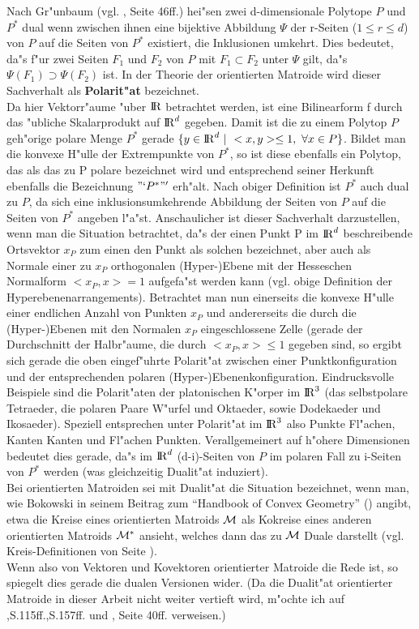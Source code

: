 Nach Gr"unbaum (vgl. \cite{Gr:67}, Seite 46ff.) hei"sen zwei d-dimensionale
Polytope $P$ und $P^*$ dual wenn zwischen ihnen eine bijektive
Abbildung $\Psi$ der r-Seiten ($1\leq r\leq d$) von $P$ auf die Seiten von
$P^*$ existiert, die Inklusionen umkehrt. Dies bedeutet, da"s f"ur zwei Seiten
$F_1$ und $F_2$ von $P$ mit $F_1\subset F_2$ unter $\Psi$ gilt, da"s
$\Psi(F_1)\supset\Psi(F_2)$ ist. In der Theorie der orientierten Matroide
wird dieser Sachverhalt als {\bf Polarit"at} bezeichnet.\\
Da hier Vektorr"aume "uber $\mbox{$\rm I\!R$}$ betrachtet werden, ist eine Bilinearform f
durch das "ubliche Skalarprodukt auf $\mbox{$\rm I\!R$}^d$ gegeben. Damit ist die zu einem
Polytop $P$ geh"orige polare Menge $P^*$ gerade
$\{y\in\mbox{$\rm I\!R$}^d~|~<x,y>\leq 1,~\forall x\in P\}$.
Bildet man die konvexe H"ulle der Extrempunkte von $P^*$, so ist diese ebenfalls
ein Polytop, das als das zu P polare bezeichnet wird und entsprechend seiner
Herkunft ebenfalls die Bezeichnung $"`P^*"'$ erh"alt. Nach obiger Definition ist
$P^*$ auch dual zu $P$, da sich eine inklusionsumkehrende Abbildung der
Seiten von $P$ auf die Seiten von $P^*$ angeben l"a"st. Anschaulicher ist dieser
Sachverhalt darzustellen, wenn man die Situation betrachtet, da"s der einen
Punkt P im $\mbox{$\rm I\!R$}^d$ beschreibende Ortsvektor $x_P$ zum einen den Punkt als solchen
bezeichnet, aber auch als Normale einer zu $x_P$ orthogonalen (Hyper-)Ebene mit
der Hesseschen Normalform $<x_P,x>=1$ aufgefa"st werden kann (vgl. obige
Definition der Hyperebenenarrangements). Betrachtet man nun einerseits die
konvexe H"ulle einer endlichen Anzahl von Punkten $x_P$ und andererseits die
durch die (Hyper-)Ebenen mit den Normalen $x_P$ eingeschlossene Zelle
(gerade der Durchschnitt der Halbr"aume, die durch $<x_P,x>\leq 1$ gegeben sind,
so ergibt sich gerade die oben eingef"uhrte Polarit"at zwischen einer
Punktkonfiguration und der entsprechenden polaren (Hyper-)Ebenenkonfiguration.
\label{polar} Eindrucksvolle Beispiele sind die Polarit"aten der platonischen
K"orper im $\mbox{$\rm I\!R$}^3$ (das selbstpolare Tetraeder, die polaren Paare W"urfel und
Oktaeder, sowie Dodekaeder und Ikosaeder).
Speziell entsprechen unter Polarit"at im $\mbox{$\rm I\!R$}^3$ also Punkte Fl"achen, Kanten
Kanten und Fl"achen Punkten. Verallgemeinert auf h"ohere Dimensionen
bedeutet dies gerade, da"s im $\mbox{$\rm I\!R$}^d$ (d-i)-Seiten von $P$ im polaren Fall zu
i-Seiten von $P^*$ werden (was gleichzeitig Dualit"at induziert).\\
Bei orientierten Matroiden sei mit Dualit"at die Situation
bezeichnet, wenn man, wie Bokowski in seinem Beitrag zum "`Handbook of Convex
Geometry"' (\cite{Bo:93}) angibt, etwa die Kreise eines orientierten Matroids
$\cal M$ als Kokreise eines anderen orientierten Matroids $\cal M^*$ ansieht,
welches dann das zu $\cal M$ Duale darstellt (vgl. Kreis-Definitionen von
Seite \pageref{kokreis}).\\
Wenn also von Vektoren und Kovektoren orientierter Matroide die Rede ist, so
spiegelt dies gerade die dualen Versionen wider. (Da die Dualit"at orientierter
Matroide in dieser Arbeit nicht weiter vertieft wird, m"ochte ich auf
\cite{Bj:93},S.115ff.,S.157ff. und \cite{Schu:92}, Seite 40ff. verweisen.)

